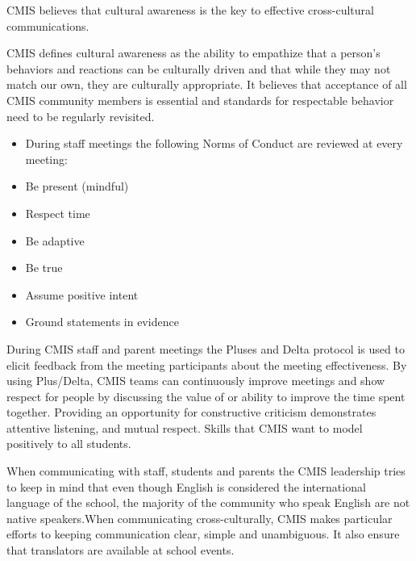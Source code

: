 

\begin{findings}
CMIS believes that cultural awareness is the key to effective cross-cultural communications. 

CMIS defines cultural awareness as the ability to empathize that a person's behaviors and reactions can be culturally driven and that while they may not match our own, they are culturally appropriate. It believes that acceptance of all CMIS community members is essential and standards for respectable behavior need to be regularly revisited. 


\begin{itemize}
\item During staff meetings the following Norms of Conduct are reviewed at every meeting:
\item Be present (mindful)
\item Respect time
\item Be adaptive
\item Be true
\item Assume positive intent
\item Ground statements in evidence
\end{itemize}

During CMIS staff and parent meetings the Pluses and Delta protocol is used to elicit feedback from the meeting participants about the meeting effectiveness. By using Plus/Delta, CMIS teams can continuously improve meetings and show respect for people by discussing the value of or ability to improve the time spent together. Providing an opportunity for constructive criticism demonstrates attentive listening, and mutual respect. Skills that CMIS want to model positively to all  students.

When communicating with staff, students and parents the CMIS leadership tries to keep in mind that even though English is considered the international language of the school, the majority of the community who speak English are not native speakers.When communicating cross-culturally, CMIS makes particular efforts to keeping communication clear, simple and unambiguous. It also ensure that translators are available at school events.


\end{findings}
